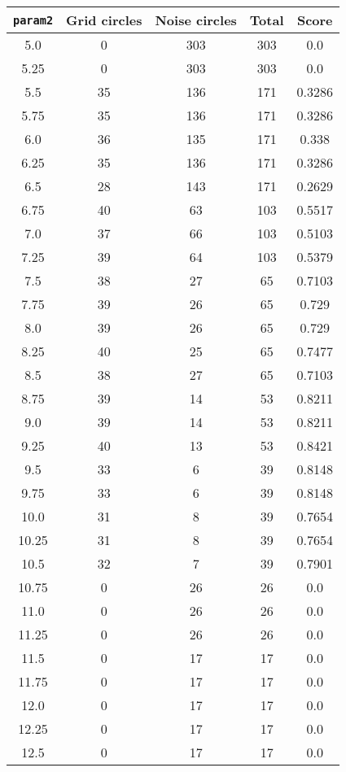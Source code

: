 \documentclass[letterpaper, 12pt]{article}
\begin{document}
\begin{longtable}{|c|c|c|c|c|}
\hline
\textbf{\texttt{param2}} & \textbf{Grid circles} & \textbf{Noise circles} & \textbf{Total} & \textbf{Score} \\
\hline
5.0 & 0 & 303 & 303 & 0.0 \\
\hline
5.25 & 0 & 303 & 303 & 0.0 \\
\hline
5.5 & 35 & 136 & 171 & 0.3286 \\
\hline
5.75 & 35 & 136 & 171 & 0.3286 \\
\hline
6.0 & 36 & 135 & 171 & 0.338 \\
\hline
6.25 & 35 & 136 & 171 & 0.3286 \\
\hline
6.5 & 28 & 143 & 171 & 0.2629 \\
\hline
6.75 & 40 & 63 & 103 & 0.5517 \\
\hline
7.0 & 37 & 66 & 103 & 0.5103 \\
\hline
7.25 & 39 & 64 & 103 & 0.5379 \\
\hline
7.5 & 38 & 27 & 65 & 0.7103 \\
\hline
7.75 & 39 & 26 & 65 & 0.729 \\
\hline
8.0 & 39 & 26 & 65 & 0.729 \\
\hline
8.25 & 40 & 25 & 65 & 0.7477 \\
\hline
8.5 & 38 & 27 & 65 & 0.7103 \\
\hline
8.75 & 39 & 14 & 53 & 0.8211 \\
\hline
9.0 & 39 & 14 & 53 & 0.8211 \\
\hline
9.25 & 40 & 13 & 53 & 0.8421 \\
\hline
9.5 & 33 & 6 & 39 & 0.8148 \\
\hline
9.75 & 33 & 6 & 39 & 0.8148 \\
\hline
10.0 & 31 & 8 & 39 & 0.7654 \\
\hline
10.25 & 31 & 8 & 39 & 0.7654 \\
\hline
10.5 & 32 & 7 & 39 & 0.7901 \\
\hline
10.75 & 0 & 26 & 26 & 0.0 \\
\hline
11.0 & 0 & 26 & 26 & 0.0 \\
\hline
11.25 & 0 & 26 & 26 & 0.0 \\
\hline
11.5 & 0 & 17 & 17 & 0.0 \\
\hline
11.75 & 0 & 17 & 17 & 0.0 \\
\hline
12.0 & 0 & 17 & 17 & 0.0 \\
\hline
12.25 & 0 & 17 & 17 & 0.0 \\
\hline
12.5 & 0 & 17 & 17 & 0.0 \\

\end{longtable}
\end{document}
